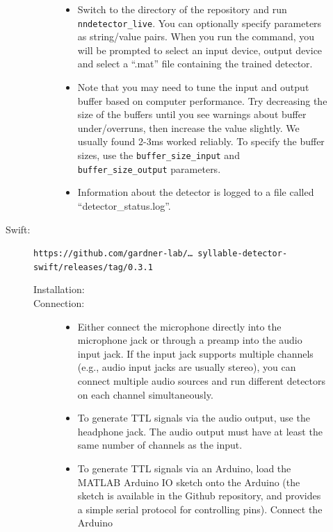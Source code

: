 \documentclass[10pt,letterpaper]{article}
\begin{document}
\begin{description}
\begin{description}
\begin{description}
      \begin{itemize}
      \item Switch to the directory of the repository and run {\tt nndetector\_live}. You
      can optionally specify parameters as string/value pairs. When you run the command,
      you will be prompted to select an input device, output device and select a ``.mat''
      file containing the trained detector.
      \item Note that you may need to tune the input and output buffer based on computer 
      performance. Try decreasing the size of the buffers until you see warnings about buffer
      under/overruns, then increase the value slightly. We usually found 2-3ms worked reliably.
      To specify the buffer sizes, use the {\tt buffer\_size\_input} and 
      {\tt buffer\_size\_output} parameters.
      \item Information about the detector is logged to a file called ``detector\_status.log''.
      \end{itemize}
    \end{description}
  \item[Swift:] {\tt https://github.com/gardner-lab/\dots\ syllable-detector-swift/releases/tag/0.3.1}
    \begin{description}
    \item[Installation:]\hfill
    \item[Connection:]\hfill
      \begin{itemize}
      \item Either connect the microphone directly into the microphone jack or through a 
      preamp into the audio input jack. If the input jack supports multiple channels (e.g., 
      audio input jacks are usually stereo), you can connect multiple audio sources and run 
      different detectors on each channel simultaneously.
      \item To generate TTL signals via the audio output, use the headphone jack. The 
      audio output must have at least the same number of channels as the input.
      \item To generate TTL signals via an Arduino, load the MATLAB Arduino IO sketch 
      onto the Arduino (the sketch is available in the Github repository, and provides a 
      simple serial protocol for controlling pins). Connect the Arduino 

\end{itemize}
\end{description}
\end{description}
\end{description}
\end{document}
